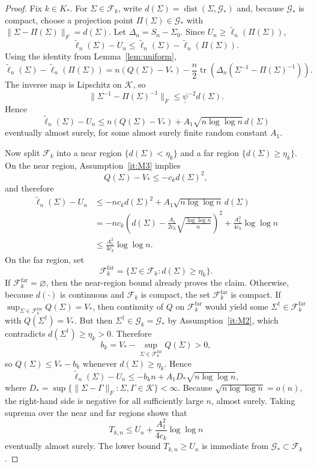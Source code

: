 \documentclass[10pt,a4paper]{amsart}
\newcommand{\dist}{\mathop{\mathrm{dist}}}
\newcommand{\tr}{\mathop{\mathrm{tr}}}
\begin{document}
\begin{proof}
Fix $k\in K_{*}$. For $\Sigma\in\mathcal{F}_{k}$, write $d(\Sigma)=\dist(\Sigma,\mathcal{G}_{*})$
and, because $\mathcal{G}_{*}$ is compact, choose a projection point
$\Pi(\Sigma)\in\mathcal{G}_{*}$ with $\|\Sigma-\Pi(\Sigma)\|_{F}=d(\Sigma)$.
Let $\Delta_{n}=S_{n}-\Sigma_{0}$. Since $U_{n}\ge\widetilde{\ell}_{n}(\Pi(\Sigma))$, 
\[
\widetilde{\ell}_{n}(\Sigma)-U_{n}\le\widetilde{\ell}_{n}(\Sigma)-\widetilde{\ell}_{n}(\Pi(\Sigma)).
\]
Using the identity from Lemma~\ref{lem:uniform}, 
\[
\widetilde{\ell}_{n}(\Sigma)-\widetilde{\ell}_{n}(\Pi(\Sigma))=n\left(Q(\Sigma)-V_{*}\right)-\frac{n}{2}\tr\left(\Delta_{n}(\Sigma^{-1}-\Pi(\Sigma)^{-1})\right).
\]
The inverse map is Lipschitz on $\mathcal{K}$, so 
\[
\|\Sigma^{-1}-\Pi(\Sigma)^{-1}\|_{F}\le\underline{\psi}^{-2}d(\Sigma).
\]
Hence 
\[
\widetilde{\ell}_{n}(\Sigma)-U_{n}\le n\left(Q(\Sigma)-V_{*}\right)+A_{1}\sqrt{n\log\log n}\,d(\Sigma)
\]
eventually almost surely, for some almost surely finite random constant
$A_{1}$.

Now split $\mathcal{F}_{k}$ into a near region $\{d(\Sigma)<\eta_{k}\}$
and a far region $\{d(\Sigma)\ge\eta_{k}\}$. On the near region,
Assumption~\ref{it:M3} implies 
\[
Q(\Sigma)-V_{*}\le-c_{k}d(\Sigma)^{2},
\]
and therefore 
\begin{align*}
\widetilde{\ell}_{n}(\Sigma)-U_{n} & \le-nc_{k}d(\Sigma)^{2}+A_{1}\sqrt{n\log\log n}\,d(\Sigma)\\
 & =-nc_{k}\left(d(\Sigma)-\frac{A_{1}}{2c_{k}}\sqrt{\frac{\log\log n}{n}}\right)^{2}+\frac{A_{1}^{2}}{4c_{k}}\log\log n\\
 & \le\frac{A_{1}^{2}}{4c_{k}}\log\log n.
\end{align*}
On the far region, set 
\[
\mathcal{F}_{k}^{\mathrm{far}}=\{\Sigma\in\mathcal{F}_{k}:d(\Sigma)\ge\eta_{k}\}.
\]
If $\mathcal{F}_{k}^{\mathrm{far}}=\varnothing$, then the near-region
bound already proves the claim. Otherwise, because $d(\cdot)$
is continuous and $\mathcal{F}_{k}$ is compact, the set $\mathcal{F}_{k}^{\mathrm{far}}$
is compact. If $\sup_{\Sigma\in\mathcal{F}_{k}^{\mathrm{far}}}Q(\Sigma)=V_{*}$,
then continuity of $Q$ on $\mathcal{F}_{k}^{\mathrm{far}}$ would
yield some $\Sigma^{\dagger}\in\mathcal{F}_{k}^{\mathrm{far}}$ with
$Q(\Sigma^{\dagger})=V_{*}$. But then $\Sigma^{\dagger}\in\mathcal{G}_{k}=\mathcal{G}_{*}$
by Assumption~\ref{it:M2}, which contradicts $d(\Sigma^{\dagger})\ge\eta_{k}>0$.
Therefore 
\[
b_{k}=V_{*}-\sup_{\Sigma\in\mathcal{F}_{k}^{\mathrm{far}}}Q(\Sigma)>0,
\]
so $Q(\Sigma)\le V_{*}-b_{k}$ whenever $d(\Sigma)\ge\eta_{k}$. Hence
\[
\widetilde{\ell}_{n}(\Sigma)-U_{n}\le-b_{k}n+A_{1}D_{*}\sqrt{n\log\log n},
\]
where $D_{*}=\sup\{\|\Sigma-\Gamma\|_{F}:\Sigma,\Gamma\in\mathcal{K}\}<\infty$.
Because $\sqrt{n\log\log n}=o(n)$, the right-hand side is negative
for all sufficiently large $n$, almost surely. Taking suprema over
the near and far regions shows that 
\[
T_{k,n}\le U_{n}+\frac{A_{1}^{2}}{4c_{k}}\log\log n
\]
eventually almost surely. The lower bound $T_{k,n}\ge U_{n}$ is immediate
from $\mathcal{G}_{*}\subset\mathcal{F}_{k}$. 
\end{proof}
\end{document}
